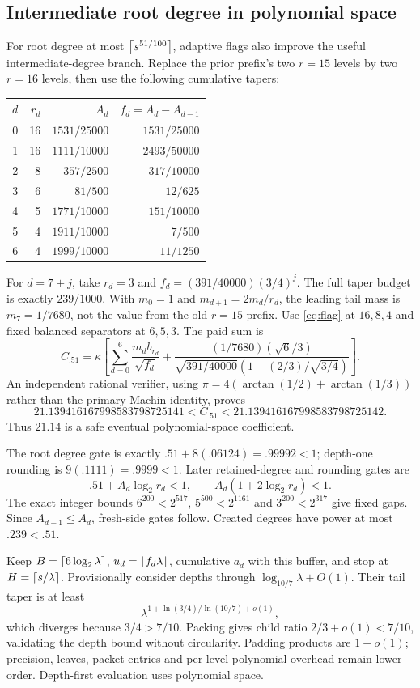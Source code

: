 \documentclass[11pt,letterpaper]{article}
\theoremstyle{remark}\newtheorem{remark}[theorem]{Remark}
\begin{document}
\subsection{Intermediate root degree in polynomial space}
For root degree at most $\left\lceil s^{51/100}\right\rceil$, adaptive flags also improve the useful intermediate-degree branch. Replace the prior prefix's two $r=15$ levels by two $r=16$ levels, then use the following cumulative tapers:
\begin{center}\small
\begin{tabular}{@{}crrr@{}}\toprule
$d$ & $r_d$ & $A_d$ & $f_d=A_d-A_{d-1}$\\\midrule
0&16&$1531/25000$&$1531/25000$\\
1&16&$1111/10000$&$2493/50000$\\
2&8&$357/2500$&$317/10000$\\
3&6&$81/500$&$12/625$\\
4&5&$1771/10000$&$151/10000$\\
5&4&$1911/10000$&$7/500$\\
6&4&$1999/10000$&$11/1250$\\\bottomrule
\end{tabular}
\end{center}
For $d=7+j$, take $r_d=3$ and $f_d=(391/40000)(3/4)^j$. The full taper budget is exactly $239/1000$. With $m_0=1$ and $m_{d+1}=2m_d/r_d$, the leading tail mass is $m_7=1/7680$, not the value from the old $r=15$ prefix. Use \eqref{eq:flag} at $16,8,4$ and fixed balanced separators at $6,5,3$. The paid sum is
\[
 C_{.51}=\kappa\left[
 \sum_{d=0}^6\frac{m_db_{r_d}}{\sqrt{f_d}}+
 \frac{(1/7680)(\sqrt6/3)}
 {\sqrt{391/40000}\left(1-(2/3)/\sqrt{3/4}\right)}\right].
\]
An independent rational verifier, using $\pi=4(\arctan(1/2)+\arctan(1/3))$ rather than the primary Machin identity, proves
\[
 21.139416167998583798725141<C_{.51}
 <21.139416167998583798725142.
\]
Thus $21.14$ is a safe eventual polynomial-space coefficient.

The root degree gate is exactly $.51+8(.06124)=.99992<1$; depth-one rounding is $9(.1111)=.9999<1$. Later retained-degree and rounding gates are
\[
 .51+A_d\log_2r_d<1,\qquad A_d(1+2\log_2r_d)<1.
\]
The exact integer bounds $6^{200}<2^{517}$, $5^{500}<2^{1161}$ and $3^{200}<2^{317}$ give fixed gaps. Since $A_{d-1}\le A_d$, fresh-side gates follow. Created degrees have power at most $.239<.51$.

Keep $B=\left\lceil6\log_2\lambda\right\rceil$, $u_d=\left\lfloor f_d\lambda\right\rfloor$, cumulative $a_d$ with this buffer, and stop at $H=\left\lceil s/\lambda\right\rceil$. Provisionally consider depths through $\log_{10/7}\lambda+O(1)$. Their tail taper is at least
\[
 \lambda^{1+\ln(3/4)/\ln(10/7)+o(1)},
\]
which diverges because $3/4>7/10$. Packing gives child ratio $2/3+o(1)<7/10$, validating the depth bound without circularity. Padding products are $1+o(1)$; precision, leaves, packet entries and per-level polynomial overhead remain lower order. Depth-first evaluation uses polynomial space.
\end{document}

